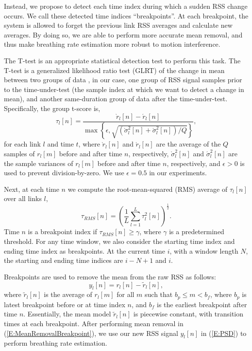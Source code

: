 \documentclass[10pt,journal,letterpaper]{IEEEtran}
\begin{document}
Instead, we propose to detect each time index during which a sudden RSS change occurs.  We call these detected time indices ``breakpoints''.  At each breakpoint, the system is allowed to forget the previous link RSS averages and calculate new averages.  By doing so, we are able to perform more accurate mean removal, and thus make breathing rate estimation more robust to motion interference.

The T-test is an appropriate statistical detection test to perform this task.  The T-test is a generalized likelihood ratio test (GLRT) of the change in mean between two groups of data \cite{kay1993detection}, in our case, one group of RSS signal samples prior to the time-under-test (the sample index at which we want to detect a change in mean), and another same-duration group of data after the time-under-test. Specifically, the group t-score is,
\begin{equation} \label{E:Tscore}
  \tau_l[n] = \frac{ \grave{r}_l[n] - \acute{r}_l[n]}{ \max\left\{ \epsilon, \sqrt{ (\grave{\sigma}^2_l[n] + \acute{\sigma}^2_l[n]) / Q} \right\}},
\end{equation}
for each link $l$ and time $t$, where $\grave{r}_l[n]$ and $\acute{r}_l[n]$ are the average of the $Q$ samples of $r_l[m]$ before and after time $n$, respectively, $\grave{\sigma}^2_l[n]$ and $\acute{\sigma}^2_l[n]$ are the sample variances of $r_l[m]$ before and after time $n$, respectively, and $\epsilon>0$ is used to prevent division-by-zero.  We use $\epsilon=0.5$ in our experiments.

Next, at each time $n$ we compute the root-mean-squared (RMS) average of $\tau_l[n]$ over all links $l$,
\begin{equation}
  \tau_{RMS}[n] = \left( \frac{1}{L} \sum_{l=1}^L \tau^2_l[n]  \right)^{\frac{1}{2}}.
\end{equation}
Time $n$ is a breakpoint index if $\tau_{RMS}[n] \ge \gamma$, where $\gamma$ is a predetermined threshold.  For any time window, we also consider the starting time index and ending time index as breakpoints.  At the current time $i$, with a window length $N$, the starting and ending time indices are $i-N+1$ and $i$.

Breakpoints are used to remove the mean from the raw RSS as follows:
\begin{equation}\label{E:MeanRemovalBreakpoint}
y_l[n] = r_l[n] - \tilde{r}_l[n],
\end{equation}
where $\tilde{r}_l[n]$ is the average of $r_l[m]$ for all $m$ such that $b_p \le m < b_f$, where $b_p$ is latest breakpoint before or at time index $n$, and $b_f$ is the earliest breakpoint after time $n$.  Essentially, the mean model $\tilde{r}_l[n]$ is piecewise constant, with transition times at each breakpoint. After performing mean removal in (\ref{E:MeanRemovalBreakpoint}), we use our new RSS signal $y_l[n]$ in (\ref{E:PSD}) to perform breathing rate estimation.
\end{document}
